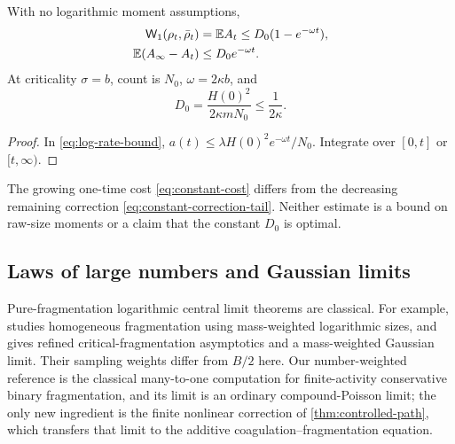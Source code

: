 \begin{corollary}\label{cor:constant-cost}
With no logarithmic moment assumptions,
\begin{align}
 \mathsf W_1(\rho_t,\bar\rho_t)&=\mathbb E A_t
           \leq D_0(1-e^{-\omega t}),\label{eq:constant-cost}\\
 \mathbb E(A_\infty-A_t)&\leq D_0e^{-\omega t}.
 \label{eq:constant-correction-tail}
\end{align}
At criticality $\sigma=b$, count is $N_0$, $\omega=2\kappa b$, and
\begin{equation}
 D_0=\frac{H(0)^2}{2\kappa mN_0}\leq\frac1{2\kappa}.
 \label{eq:critical-cost}
\end{equation}
\end{corollary}

\begin{proof}
In \eqref{eq:log-rate-bound}, $a(t)\leq\lambda H(0)^2
e^{-\omega t}/N_0$. Integrate over $[0,t]$ or $[t,\infty)$.
\end{proof}

The growing one-time cost \eqref{eq:constant-cost} differs from the
decreasing remaining correction \eqref{eq:constant-correction-tail}.
Neither estimate is a bound on raw-size moments or a claim that the
constant $D_0$ is optimal.

\subsection{Laws of large numbers and Gaussian limits}

Pure-fragmentation logarithmic central limit theorems are classical.
For example, \citet{Bertoin2003} studies homogeneous fragmentation
using mass-weighted logarithmic sizes, and
\citet{DoumicEscobedo2016} gives refined critical-fragmentation
asymptotics and a mass-weighted Gaussian limit. Their sampling weights
differ from $B/2$ here. Our number-weighted reference is the
classical many-to-one computation for finite-activity conservative
binary fragmentation, and its limit is an ordinary compound-Poisson
limit; the only new ingredient is the finite nonlinear correction of
\cref{thm:controlled-path}, which transfers that limit to the
additive coagulation--fragmentation equation.

